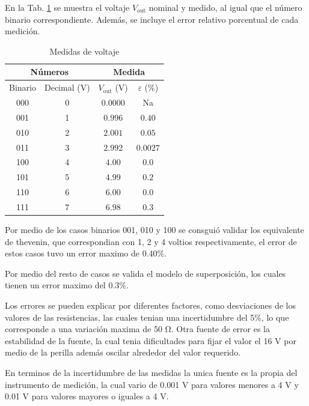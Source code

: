 En la Tab. \ref{tab:data} se muestra el voltaje $V_\text{out}$ nominal y medido, al igual que el
número binario correspondiente. Además, se incluye el error relativo porcentual de
cada medición.

\begin{table}[H]
	\centering
	\caption{Medidas de voltaje}
	\begin{tabular}{cccc}
		\multicolumn{2}{c}{Números} & \multicolumn{2}{c}{Medida} \\
		\hline 
		Binario & Decimal (\unit{\volt}) & $V_\text{out}$ (\unit{\volt}) & $\varepsilon$ (\%) \\
		000 & 0 & $0.0000$ & Na \\
		001 & 1 & $0.996$ & $0.40$ \\
		010 & 2 & $2.001$ & $0.05$ \\
		011 & 3 & $2.992$ & $0.0027$ \\
		100 & 4 & $4.00$ & $0.0$ \\
		101 & 5 & $4.99$ & $0.2$ \\
		110 & 6 & $6.00$ & $0.0$ \\
		111 & 7 & $6.98$ & $0.3$ \\
		\hline 
	\end{tabular}
	\label{tab:data}
\end{table}

Por medio de los casos binarios 001, 010 y 100 se consguió validar los equivalente de thevenin, que correspondian con 1, 2 y 4 voltios respectivamente, el error de estos casos tuvo un error maximo de 0.40\%.

Por medio del resto de casos se valida el modelo de superposición, los cuales tienen un error maximo del 0.3\%.

Los errores se pueden explicar por diferentes factores, como desviaciones de los valores de las resistencias, las cuales tenian una incertidumbre del 5\%, lo que corresponde a una variación maxima de 50 \unit{\ohm}. Otra fuente de error es la estabilidad de la fuente, la cual tenia dificultades para fijar el valor el 16 \unit{\volt} por medio de la perilla además oscilar alrededor del valor requerido.

En terminos de la incertidumbre de las medidas la unica fuente es la propia del instrumento de medición, la cual vario de 0.001 \unit{\volt} para valores menores a 4 \unit{\volt} y 0.01 \unit{\volt} para valores mayores o iguales a 4 \unit{\volt}.
